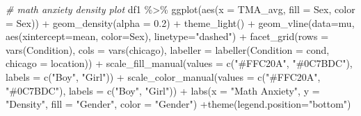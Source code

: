 \documentclass[
  letterpaper,
  DIV=11,
  numbers=noendperiod]{scrartcl}
\newenvironment{Shaded}{\begin{snugshade}}{\end{snugshade}}
\newcommand{\AttributeTok}[1]{\textcolor[rgb]{0.49,0.56,0.16}{#1}}
\newcommand{\CommentTok}[1]{\textcolor[rgb]{0.38,0.63,0.69}{\textit{#1}}}
\newcommand{\FloatTok}[1]{\textcolor[rgb]{0.25,0.63,0.44}{#1}}
\newcommand{\FunctionTok}[1]{\textcolor[rgb]{0.02,0.16,0.49}{#1}}
\newcommand{\NormalTok}[1]{\textcolor[rgb]{0.00,0.44,0.13}{#1}}
\newcommand{\SpecialCharTok}[1]{\textcolor[rgb]{0.25,0.44,0.63}{#1}}
\newcommand{\StringTok}[1]{\textcolor[rgb]{0.25,0.44,0.63}{#1}}
\begin{document}
\begin{Shaded}
\begin{Highlighting}[]
\CommentTok{\# math anxiety density plot}
\NormalTok{df1 }\SpecialCharTok{\%\textgreater{}\%} \FunctionTok{ggplot}\NormalTok{(}\FunctionTok{aes}\NormalTok{(}\AttributeTok{x =}\NormalTok{ TMA\_avg, }\AttributeTok{fill =}\NormalTok{ Sex,}
                   \AttributeTok{color =}\NormalTok{ Sex)) }\SpecialCharTok{+}
  \FunctionTok{geom\_density}\NormalTok{(}\AttributeTok{alpha =} \FloatTok{0.2}\NormalTok{) }\SpecialCharTok{+}
  \FunctionTok{theme\_light}\NormalTok{() }\SpecialCharTok{+}
  \FunctionTok{geom\_vline}\NormalTok{(}\AttributeTok{data=}\NormalTok{mu, }\FunctionTok{aes}\NormalTok{(}\AttributeTok{xintercept=}\NormalTok{mean, }\AttributeTok{color=}\NormalTok{Sex),}
           \AttributeTok{linetype=}\StringTok{"dashed"}\NormalTok{) }\SpecialCharTok{+}
  \FunctionTok{facet\_grid}\NormalTok{(}\AttributeTok{rows =} \FunctionTok{vars}\NormalTok{(Condition),}
             \AttributeTok{cols =} \FunctionTok{vars}\NormalTok{(chicago),}
             \AttributeTok{labeller =} \FunctionTok{labeller}\NormalTok{(}\AttributeTok{Condition =}\NormalTok{ cond,}
                                 \AttributeTok{chicago =}\NormalTok{ location)) }\SpecialCharTok{+}
  \FunctionTok{scale\_fill\_manual}\NormalTok{(}\AttributeTok{values =} \FunctionTok{c}\NormalTok{(}\StringTok{"\#FFC20A"}\NormalTok{, }\StringTok{"\#0C7BDC"}\NormalTok{), }\AttributeTok{labels =} \FunctionTok{c}\NormalTok{(}\StringTok{"Boy"}\NormalTok{, }\StringTok{"Girl"}\NormalTok{)) }\SpecialCharTok{+}
  \FunctionTok{scale\_color\_manual}\NormalTok{(}\AttributeTok{values =} \FunctionTok{c}\NormalTok{(}\StringTok{"\#FFC20A"}\NormalTok{, }\StringTok{"\#0C7BDC"}\NormalTok{), }\AttributeTok{labels =} \FunctionTok{c}\NormalTok{(}\StringTok{"Boy"}\NormalTok{, }\StringTok{"Girl"}\NormalTok{)) }\SpecialCharTok{+}
  \FunctionTok{labs}\NormalTok{(}\AttributeTok{x =} \StringTok{"Math Anxiety"}\NormalTok{, }\AttributeTok{y =} \StringTok{"Density"}\NormalTok{,}
       \AttributeTok{fill =} \StringTok{"Gender"}\NormalTok{, }\AttributeTok{color =} \StringTok{"Gender"}\NormalTok{) }\SpecialCharTok{+}\FunctionTok{theme}\NormalTok{(}\AttributeTok{legend.position=}\StringTok{"bottom"}\NormalTok{)}
\end{Highlighting}
\end{Shaded}
\end{document}
